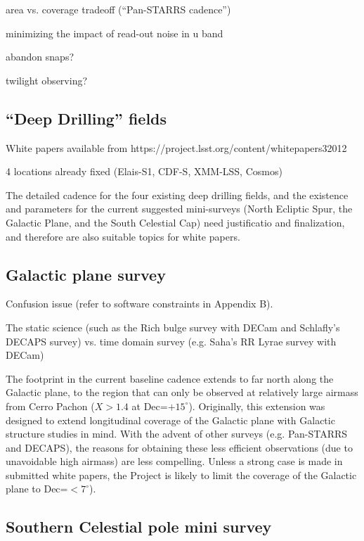 \documentclass[DM,lsstdraft,toc,usenatbib]{lsstdoc}
\begin{document}
area vs. coverage tradeoff  (``Pan-STARRS cadence'')

minimizing the impact of read-out noise in u band

abandon snaps?

twilight observing? 


\subsection{``Deep Drilling'' fields} 

White papers available from  https://project.lsst.org/content/whitepapers32012

4 locations already fixed (Elais-S1, CDF-S, XMM-LSS, Cosmos) 


The detailed cadence for the four existing deep drilling fields, and the existence and parameters 
for the current suggested mini-surveys (North Ecliptic Spur, the Galactic Plane, and the South 
Celestial Cap) need justificatio and finalization, and therefore are also suitable topics for white papers.  



\subsection{Galactic plane survey}

Confusion issue (refer to software constraints in Appendix B). 

The static science (such as the Rich bulge survey with DECam and Schlafly's DECAPS survey) 
vs. time domain survey (e.g. Saha's RR Lyrae survey with DECam)  

The footprint in the current baseline cadence extends to far north along the Galactic
plane, to the region that can only be observed at relatively large airmass from Cerro Pachon 
($X>1.4$ at Dec=$+15^\circ$). Originally, this extension was designed to extend longitudinal 
coverage of the Galactic plane with Galactic structure studies in mind. With the advent of other 
surveys (e.g. Pan-STARRS and DECAPS), the reasons for obtaining these less efficient observations 
(due to unavoidable high airmass) are less compelling. Unless a strong case is made in submitted
white papers, the Project is likely to limit the coverage of the Galactic plane to  Dec=$<7^\circ$). 



\subsection{Southern Celestial pole mini survey}
\end{document}
